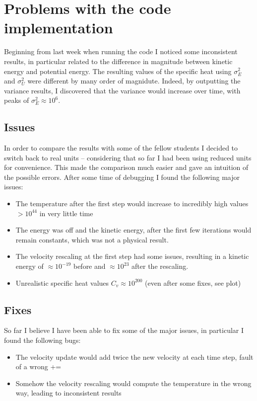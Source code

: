 \documentclass[aps,pra,reprint, onecolumn, rmp]{revtex4-2}
\begin{document}
\section{Problems with the code implementation}
Beginning from last week when running the code I noticed some inconsistent results, in particular related to the difference in magnitude between kinetic energy and potential energy. The resulting values of the specific heat using $\sigma_E^2$ and $\sigma_U^2$ were different by many order of magnidute. Indeed, by outputting the variance results, I discovered that the variance would increase over time, with peaks of $\sigma_E^2\approx 10^6$.

\subsection{Issues}
In order to compare the results with some of the fellow students I decided to switch back to real units -- considering that so far I had been using reduced units for convenience. This made the comparison much easier and gave an intuition of the possible errors. After some time of debugging I found the following major issues:
\begin{itemize}
  \item The temperature after the first step would increase to incredibly high values $>10^{44}$ in very little time
  \item The energy was off and the kinetic energy, after the first few iterations would remain constants, which was not a physical result.
  \item The velocity rescaling at the first step had some issues, resulting in a kinetic energy of $\approx 10^{-19}$ before and $\approx 10^{23}$ after the rescaling. 
  \item Unrealistic specific heat values $C_v \approx 10^{200}$ (even after some fixes, see plot)
\end{itemize}

\subsection{Fixes}
So far I believe I have been able to fix some of the major issues, in particular I found the following bugs:
\begin{itemize}
  \item The velocity update would add twice the new velocity at each time step, fault of a wrong +=
  \item Somehow the velocity rescaling would compute the temperature in the wrong way, leading to inconsistent results
\end{itemize}
\end{document}
